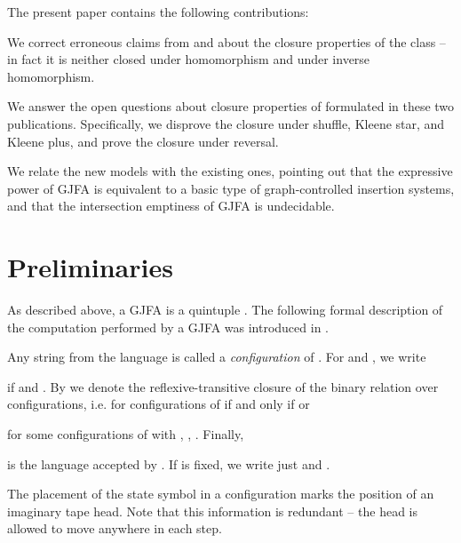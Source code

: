 \documentclass{ws-ijmpc}
\begin{document}
The present paper contains the following contributions:
\begin{romanlist}
\item We correct erroneous claims from \citep{athMED1} and \citep{athMED1book}
about the closure properties of the class  -- in fact
it is neither closed under homomorphism and under inverse homomorphism.
\item We answer the open questions about closure properties of 
formulated in these two publications. Specifically, we disprove the
closure under shuffle, Kleene star, and Kleene plus, and prove the
closure under reversal.
\item We relate the new models with the existing ones, pointing out that
the expressive power of GJFA is equivalent to a basic type of graph-controlled
insertion systems, and that the intersection emptiness of GJFA is
undecidable.
\end{romanlist}

\section{Preliminaries}

As described above, a GJFA is a quintuple .
The following formal description of the computation performed by a
GJFA was introduced in \citep{athMED1}.
\begin{definition}
Any string from the language  is called a
\emph{configuration }of . For  and ,
we write 

if  and . By 
we denote the reflexive-transitive closure of the binary relation
 over configurations, i.e. 
for configurations  of  if and only if
 or 

for some configurations  of
 with , ,
. Finally,

is the language accepted by . If  is fixed, we write just
 and .
\end{definition}
The placement of the state symbol  in a configuration 
marks the position of an imaginary tape head. Note that this information
is redundant -- the head is allowed to move anywhere in each step. 
\end{document}
